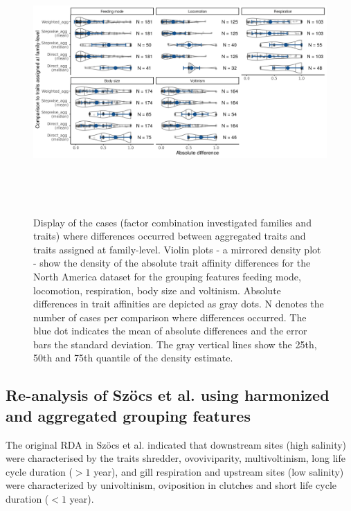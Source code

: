 \documentclass{article}
\begin{document}
\begin{figure}[H]
  \centering
  \includegraphics[width=16.5cm, height=10cm]{Deviances_trait_agg_pyne.png}
  \caption{Display of the cases (factor combination investigated families and traits) where differences occurred between aggregated traits and traits assigned at family-level. Violin plots - a mirrored density plot - show the density of the absolute trait affinity differences for the North America dataset for the grouping features feeding mode, locomotion, respiration, body size and voltinism. Absolute differences in trait affinities are depicted as gray dots. N denotes the number of cases per comparison where differences occurred. The blue dot indicates the mean of absolute differences and the error bars the standard deviation. The gray vertical lines show the 25th, 50th and 75th quantile of the density estimate.}
  \label{fig:diff_aggr_traits_pyne}
\end{figure}

\newpage 


\subsection*{Re-analysis of Szöcs et al. using harmonized and aggregated grouping features}

The original RDA in Szöcs et al. \cite{szocs_effects_2014} indicated that downstream sites (high salinity) were characterised by the traits shredder, ovoviviparity, multivoltinism, long life cycle duration ($> 1$ year), and gill respiration and upstream sites (low salinity) were characterized by univoltinism, oviposition in clutches and short life cycle duration ($< 1$ year). 
\end{document}
